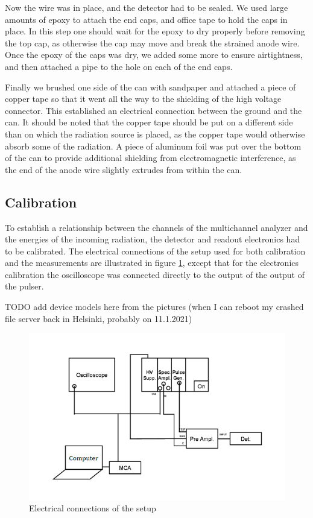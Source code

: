 \documentclass[a4paper]{article}
\begin{document}
Now the wire was in place, and the detector had to be sealed.
We used large amounts of epoxy to attach the end caps, and office tape to hold the caps in place.
In this step one should wait for the epoxy to dry properly before removing the top cap, as otherwise the cap may move and break the strained anode wire.
Once the epoxy of the caps was dry, we added some more to ensure airtightness, and then attached a pipe to the hole on each of the end caps.

Finally we brushed one side of the can with sandpaper and attached a piece of copper tape so that it went all the way to the shielding of the high voltage connector.
This established an electrical connection between the ground and the can.
It should be noted that the copper tape should be put on a different side than on which the radiation source is placed, as the copper tape would otherwise absorb some of the radiation.
A piece of aluminum foil was put over the bottom of the can to provide additional shielding from electromagnetic interference, as the end of the anode wire slightly extrudes from within the can.


\clearpage
\subsection{Calibration}
\label{setup_calibration}
To establish a relationship between the channels of the multichannel analyzer and the energies of the incoming radiation, the detector and readout electronics had to be calibrated.
The electrical connections of the setup used for both calibration and the measurements are illustrated in figure \ref{fig:connections}, except that for the electronics calibration the oscilloscope was connected directly to the output of the output of the pulser.

TODO add device models here from the pictures (when I can reboot my crashed file server back in Helsinki, probably on 11.1.2021)

\begin{figure}[ht!]
\centering
\includegraphics[width=\textwidth]{fig/instructions/connections.png}
\caption{Electrical connections of the setup \cite{instructions}}
\label{fig:connections}
\end{figure}
\end{document}

